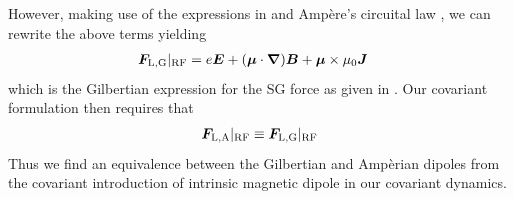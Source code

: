 However, making use of the expressions in  and Amp{\`e}re's circuital law , we can rewrite the above terms yielding
\begin{alignat}{1}
\boldsymbol{F}_\mathrm{L,G}\vert_\mathrm{RF} &= e\boldsymbol{E} +(\boldsymbol{\mu}\cdot\boldsymbol{\nabla})\boldsymbol{B}+\boldsymbol{\mu}\times\mu_{0}\boldsymbol{J}
\end{alignat}
which is the Gilbertian expression for the SG force as given in . Our covariant formulation then requires that
\begin{align}
    \boldsymbol{F}_\mathrm{L,A}\vert_\mathrm{RF} \equiv \boldsymbol{F}_\mathrm{L,G}\vert_\mathrm{RF}
\end{align}
Thus we find an equivalence between the Gilbertian and Amp{\`e}rian dipoles from the covariant introduction of intrinsic magnetic dipole in our covariant dynamics.


